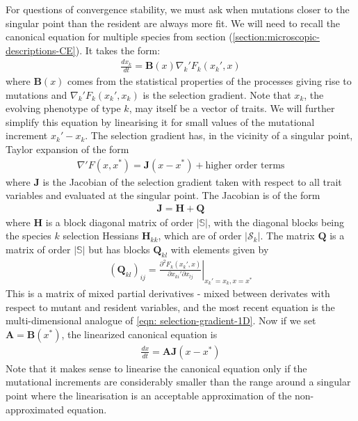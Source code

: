 For questions of convergence stability, we must ask when mutations closer to the singular point than the resident are always more fit. We will need to recall the canonical equation for multiple species from section (\ref{section:microscopic-descriptions-CE}). It takes the form: 
\begin{align}
	\frac{dx_k}{dt} = \mathbf{B}(x) \nabla_k' F_k(x_k',x)
\end{align}
where $\mathbf{B}(x)$ comes from the statistical properties of the processes giving rise to mutations and $\nabla_k' F_k(x_k',x_k)$ is the selection gradient. 
Note that $x_k$, the evolving phenotype of type $k$, may itself be a vector of traits.
We will further simplify this equation by linearising it for small values of the mutational increment $x_k'-x_k$. 
The selection gradient has, in the vicinity of a singular point, Taylor expansion of the form
\begin{align}
	\nabla' F(x,x^*) = \mathbf{J}(x - x^*) + \text{higher order terms}
\end{align}
where $\mathbf{J}$ is the Jacobian of the selection gradient taken with respect to all trait variables and evaluated at the singular point. The Jacobian is of the form
\begin{align}
	\mathbf{J} = \mathbf{H} + \mathbf{Q}
\end{align}
where $\mathbf{H}$ is a block diagonal matrix of order $|\mathbb{S}|$, with the diagonal blocks being the species $k$ selection Hessians $\mathbf{H}_{kk}$, which are of order $|\mathcal{S}_k|$. 
The matrix $\mathbf{Q}$ is a matrix of order $|\mathbb{S}|$ but has blocks $\mathbf{Q}_{kl}$ with elements given by
\begin{align}
	(\mathbf{Q}_{kl})_{ij} = \left. \frac{\partial^2 F_k(x_k',x)}{\partial x_{ki}'  \partial x_{lj}} \right|_{x_k'=x_k,x=x^*}
\end{align}
This is a matrix of mixed partial derivatives - mixed between derivates with respect to mutant and resident variables, and the most recent equation is the multi-dimensional analogue of \ref{eqn: selection-gradient-1D}. 
Now if we set $\mathbf{A}=\mathbf{B}(x^*)$, the linearized canonical equation is 
\begin{align}
	\frac{dx}{dt} = \mathbf{AJ}(x-x^*)
\end{align}
Note that it makes sense to linearise the canonical equation only if the mutational increments are considerably smaller than the range around a singular point where the linearisation is an acceptable approximation of the non-approximated equation.

